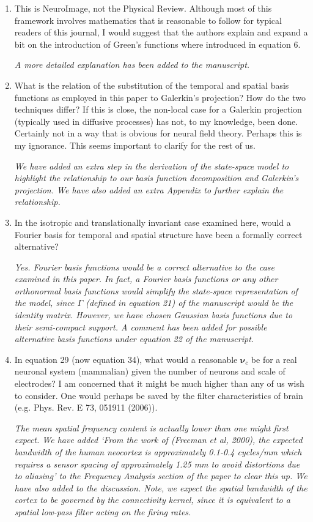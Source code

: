 \documentclass{article}
\begin{document}
\begin{enumerate}
\item This is NeuroImage, not the Physical Review. Although most of this framework involves mathematics that is reasonable to follow for typical readers of this journal, I would suggest that the authors explain and expand a bit on the introduction of Green's functions where introduced in equation 6.

\emph{A more detailed explanation has been added to the manuscript.}

\item What is the relation of the substitution of the temporal and spatial basis functions as employed in this paper to Galerkin's projection? How do the two techniques differ? If this is close, the non-local case for a Galerkin projection (typically used in diffusive processes) has not, to my knowledge, been done. Certainly not in a way that is obvious for neural field theory. Perhaps this is my ignorance. This seems important to clarify for the rest of us.

\emph{We have added an extra step in the derivation of the state-space model to highlight the relationship to our basis function decomposition and Galerkin's projection. We have also added an extra Appendix to further explain the relationship.}

\item In the isotropic and translationally invariant case examined here, would a Fourier basis for temporal and spatial structure have been a formally correct alternative?

\emph{Yes. Fourier basis functions would be a correct alternative to the case examined in this paper. In fact, a Fourier basis functions or any other orthonormal basis functions would simplify the state-space representation of the model, since $\Gamma$ (defined in equation 21) of the manuscript would be the identity matrix. However, we have chosen Gaussian basis functions due to their semi-compact support. A comment has been added for possible alternative basis functions under equation 22 of the manuscript.}

\item In equation 29 (now equation 34), what would a reasonable $\boldsymbol{\nu}_c$ be for a real neuronal system (mammalian) given the number of neurons and scale of electrodes? I am concerned that it might be much higher than any of us wish to consider. One would perhaps be saved by the filter characteristics of brain (e.g. Phys. Rev. E 73, 051911 (2006)).

\emph{The mean spatial frequency content is actually lower than one might first expect. We have added `From the work of (Freeman et al, 2000), the expected bandwidth of the human neocortex is approximately 0.1-0.4 cycles/mm which requires a sensor spacing of approximately 1.25 mm to avoid distortions due to aliasing' to the Frequency Analysis section of the paper to clear this up. We have also added to the discussion. Note, we expect the spatial bandwidth of the cortex to be governed by the connectivity kernel, since it is equivalent to a spatial low-pass filter acting on the firing rates.}


\end{enumerate}
\end{document}
